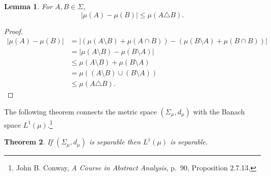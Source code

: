\documentclass{article}
\newtheorem{theorem}{Theorem}
\newtheorem{lemma}[theorem]{Lemma}
\theoremstyle{definition}
\begin{document}
\begin{lemma}
For $A, B \in \Sigma$,
\[
|\mu(A)-\mu(B)| \leq \mu(A \triangle B).
\]
\end{lemma}
\begin{proof}
\begin{align*}
|\mu(A)-\mu(B)|&=|(\mu(A \setminus B) + \mu(A \cap B)) - 
(\mu(B \setminus A) + \mu(B \cap B))|\\
&=|\mu(A \setminus B)-\mu(B \setminus A)|\\
&\leq \mu(A \setminus B)+\mu(B \setminus A)\\
&=\mu((A \setminus B) \cup (B \setminus A))\\
&\leq \mu(A \triangle B).
\end{align*}
\end{proof}


The following theorem connects the metric space $(\Sigma_\mu,d_\mu)$ with the Banach space
$L^1(\mu)$.\footnote{John B. Conway, {\em A Course in Abstract Analysis}, p.~90, Proposition 2.7.13.}

\begin{theorem}
If $(\Sigma_\mu,d_\mu)$ is separable then $L^1(\mu)$ is separable.
\end{theorem}
\end{document}
